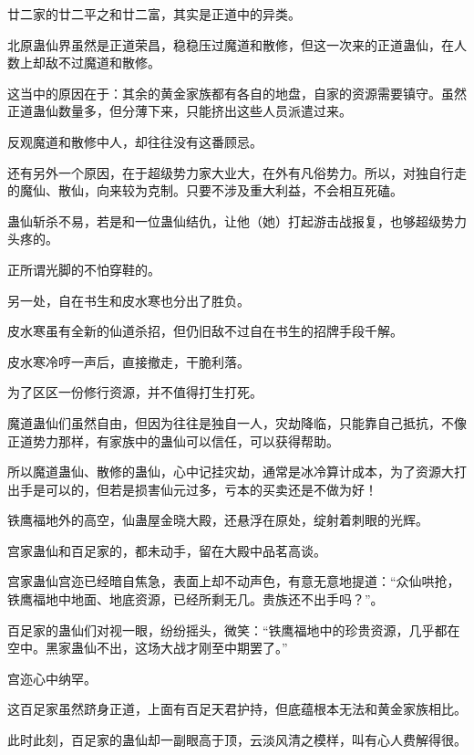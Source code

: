 \begin{this_body}
廿二家的廿二平之和廿二富，其实是正道中的异类。

北原蛊仙界虽然是正道荣昌，稳稳压过魔道和散修，但这一次来的正道蛊仙，在人数上却敌不过魔道和散修。

这当中的原因在于：其余的黄金家族都有各自的地盘，自家的资源需要镇守。虽然正道蛊仙数量多，但分薄下来，只能挤出这些人员派遣过来。

反观魔道和散修中人，却往往没有这番顾忌。

还有另外一个原因，在于超级势力家大业大，在外有凡俗势力。所以，对独自行走的魔仙、散仙，向来较为克制。只要不涉及重大利益，不会相互死磕。

蛊仙斩杀不易，若是和一位蛊仙结仇，让他（她）打起游击战报复，也够超级势力头疼的。

正所谓光脚的不怕穿鞋的。

另一处，自在书生和皮水寒也分出了胜负。

皮水寒虽有全新的仙道杀招，但仍旧敌不过自在书生的招牌手段千解。

皮水寒冷哼一声后，直接撤走，干脆利落。

为了区区一份修行资源，并不值得打生打死。

魔道蛊仙们虽然自由，但因为往往是独自一人，灾劫降临，只能靠自己抵抗，不像正道势力那样，有家族中的蛊仙可以信任，可以获得帮助。

所以魔道蛊仙、散修的蛊仙，心中记挂灾劫，通常是冰冷算计成本，为了资源大打出手是可以的，但若是损害仙元过多，亏本的买卖还是不做为好！

铁鹰福地外的高空，仙蛊屋金晓大殿，还悬浮在原处，绽射着刺眼的光辉。

宫家蛊仙和百足家的，都未动手，留在大殿中品茗高谈。

宫家蛊仙宫迩已经暗自焦急，表面上却不动声色，有意无意地提道：“众仙哄抢，铁鹰福地中地面、地底资源，已经所剩无几。贵族还不出手吗？”。

百足家的蛊仙们对视一眼，纷纷摇头，微笑：“铁鹰福地中的珍贵资源，几乎都在空中。黑家蛊仙不出，这场大战才刚至中期罢了。”

宫迩心中纳罕。

这百足家虽然跻身正道，上面有百足天君护持，但底蕴根本无法和黄金家族相比。

此时此刻，百足家的蛊仙却一副眼高于顶，云淡风清之模样，叫有心人费解得很。

\end{this_body}

